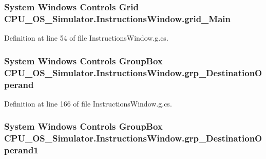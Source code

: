 \subsubsection[{grid\+\_\+\+Main}]{\setlength{\rightskip}{0pt plus 5cm}System Windows Controls Grid C\+P\+U\+\_\+\+O\+S\+\_\+\+Simulator.\+Instructions\+Window.\+grid\+\_\+\+Main\hspace{0.3cm}{\ttfamily [package]}}\label{class_c_p_u___o_s___simulator_1_1_instructions_window_a83e86d19573c6c56db33e047354169a1}


Definition at line 54 of file Instructions\+Window.\+g.\+cs.

\hypertarget{class_c_p_u___o_s___simulator_1_1_instructions_window_a836175caed2a6d02d8635bb6cc3f6cae}{}
\subsubsection[{grp\+\_\+\+Destination\+Operand}]{\setlength{\rightskip}{0pt plus 5cm}System Windows Controls Group\+Box C\+P\+U\+\_\+\+O\+S\+\_\+\+Simulator.\+Instructions\+Window.\+grp\+\_\+\+Destination\+Operand\hspace{0.3cm}{\ttfamily [package]}}\label{class_c_p_u___o_s___simulator_1_1_instructions_window_a836175caed2a6d02d8635bb6cc3f6cae}


Definition at line 166 of file Instructions\+Window.\+g.\+cs.

\hypertarget{class_c_p_u___o_s___simulator_1_1_instructions_window_ab89f01ff39ce6f5ed461fcf5242be3a5}{}
\subsubsection[{grp\+\_\+\+Destination\+Operand1}]{\setlength{\rightskip}{0pt plus 5cm}System Windows Controls Group\+Box C\+P\+U\+\_\+\+O\+S\+\_\+\+Simulator.\+Instructions\+Window.\+grp\+\_\+\+Destination\+Operand1\hspace{0.3cm}{\ttfamily [package]}}\label{class_c_p_u___o_s___simulator_1_1_instructions_window_ab89f01ff39ce6f5ed461fcf5242be3a5}


